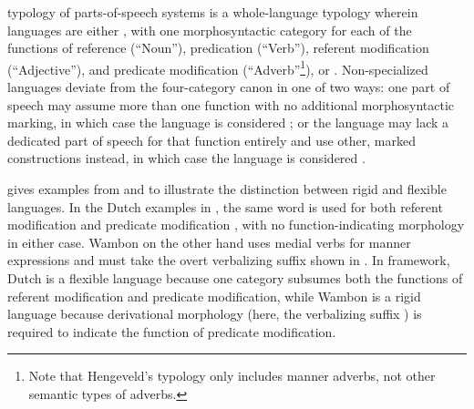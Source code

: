  typology of parts-of-speech systems is a whole-language typology wherein languages are either , with one morphosyntactic category for each of the functions of reference (\enquote{Noun}), predication (\enquote{Verb}), referent modification (\enquote{Adjective}), and predicate modification (\enquote{Adverb}\footnote{Note that Hengeveld's typology only includes manner adverbs, not other semantic types of adverbs.}), or . Non-specialized languages deviate from the four-category canon in one of two ways: one part of speech may assume more than one function with no additional morphosyntactic marking, in which case the language is considered ; or the language may lack a dedicated part of speech for that function entirely and use other, marked constructions instead, in which case the language is considered .

\citeauthor{Hengeveld1992} gives examples from  and  to illustrate the distinction between rigid and flexible languages. In the Dutch examples in , the same word  is used for both referent modification  and predicate modification , with no function-indicating morphology in either case. Wambon on the other hand uses medial verbs for manner expressions and must take the overt verbalizing suffix  shown in . In  framework, Dutch is a flexible language because one category subsumes both the functions of referent modification and predicate modification, while Wambon is a rigid language because derivational morphology (here, the verbalizing suffix ) is required to indicate the function of predicate modification.

